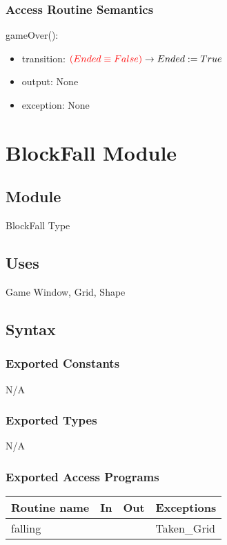 \documentclass[12pt]{article}
\begin{document}
\subsubsection* {Access Routine Semantics}

\noindent gameOver():
\begin{itemize}
\item transition: $ \textcolor{red}{(Ended \equiv False)} \rightarrow Ended := True$ 
\item output: None
\item exception: None
\end{itemize}

\newpage

\section* {BlockFall Module}

\subsection*{Module}
BlockFall Type
\subsection* {Uses}

Game Window, Grid, Shape

\subsection* {Syntax}

\subsubsection* {Exported Constants}
N/A
\subsubsection* {Exported Types}

N/A

\subsubsection* {Exported Access Programs}

\begin{tabular}{| l | l | l | l |}
\hline
\textbf{Routine name} & \textbf{In} & \textbf{Out} & \textbf{Exceptions}\\
\hline
falling &  &  & Taken\_Grid \\
\hline
\end{tabular}
\end{document}
